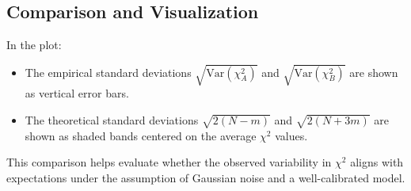 \documentclass{article}
\begin{document}
\subsection*{Comparison and Visualization}

In the plot:
\begin{itemize}
    \item The empirical standard deviations $\sqrt{\mathrm{Var}(\chi^2_A)}$ and $\sqrt{\mathrm{Var}(\chi^2_B)}$ are shown as vertical error bars.
    \item The theoretical standard deviations $\sqrt{2(N - m)}$ and $\sqrt{2(N + 3m)}$ are shown as shaded bands centered on the average $\chi^2$ values.
\end{itemize}

This comparison helps evaluate whether the observed variability in $\chi^2$ aligns with expectations under the assumption of Gaussian noise and a well-calibrated model.
\end{document}
